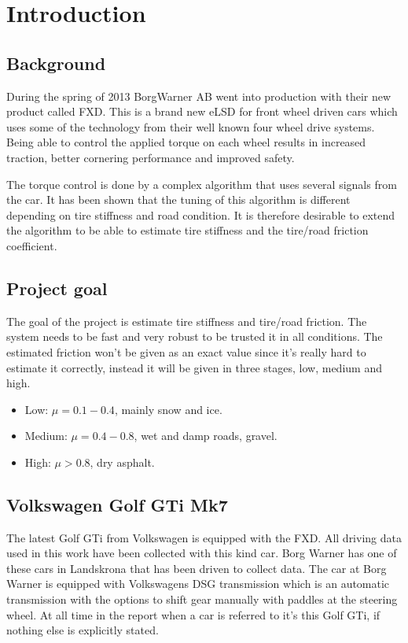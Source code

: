 \chapter{Introduction}

\section{Background}
During the spring of 2013 BorgWarner AB went into production with their new product called FXD. This is a brand new eLSD for front wheel driven cars which uses some of the technology from their well known four wheel drive systems. Being able to control the applied torque on each wheel results in increased traction, better cornering performance and improved safety.

The torque control is done by a complex algorithm that uses several signals from the car. It has been shown that the tuning of this algorithm is different depending on tire stiffness and road condition. It is therefore desirable to extend the algorithm to be able to estimate tire stiffness and the tire/road friction coefficient.

\section{Project goal}
The goal of the project is estimate tire stiffness and tire/road friction. The system needs to be fast and very robust to be trusted it in all conditions. The estimated friction won't be given as an exact value since it's really hard to estimate it correctly, instead it will be given in three stages, low, medium and high.

\begin{itemize}
	\item Low: $ \mu = 0.1-0.4 $, mainly snow and ice.
	\item Medium: $ \mu = 0.4-0.8 $, wet and damp roads, gravel.
	\item High: $ \mu > 0.8 $, dry asphalt.
\end{itemize}

\section{Volkswagen Golf GTi Mk7}
The latest Golf GTi from Volkswagen is equipped with the FXD. All driving data used in this work have been collected with this kind car. Borg Warner has one of these cars in Landskrona that has been driven to collect data. The car at Borg Warner is equipped with Volkswagens DSG transmission which is an automatic transmission with the options to shift gear manually with paddles at the steering wheel. At all time in the report when a car is referred to it's this Golf GTi, if nothing else is explicitly stated.

